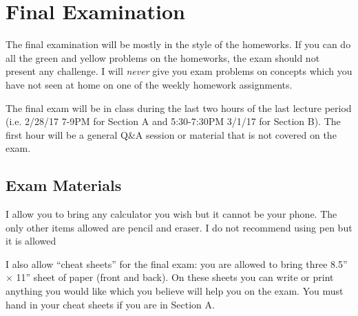 \documentclass[12pt]{article}
\newcommand{\qu}[1]{``#1''}
\begin{document}
\section*{Final Examination}

The final examination will be mostly in the style of the homeworks. If you can do all the green and yellow problems on the homeworks, the exam should not present any challenge. I will \textit{never} give you exam problems on concepts which you have not seen at home on one of the weekly homework assignments. 

The final exam will be in class during the last two hours of the last lecture period (i.e. 2/28/17 7-9PM for Section A and 5:30-7:30PM 3/1/17 for Section B). The first hour will be a general Q\&A session or material that is not covered on the exam.


%

\subsection*{Exam Materials}

I allow you to bring any calculator you wish but it cannot be your phone. The only other items allowed are pencil and eraser. I do not recommend using pen but it is allowed

I also allow \qu{cheat sheets} for the final exam: you are allowed to bring three 8.5'' $\times$ 11'' sheet of paper (front and back). On these sheets you can write or print anything you would like which you believe will help you on the exam. You must hand in your cheat sheets if you are in Section A.

%
\end{document}
